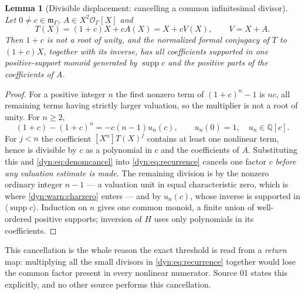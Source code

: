 \documentclass[11pt,letterpaper]{article}
\newtheorem{lemma}[lemma]{Lemma}
\theoremstyle{definition}
\theoremstyle{remark}
\newcommand{\Q}{\mathbb Q}
\newcommand{\OO}{\mathcal O}
\newcommand{\m}{\mathfrak m}
\newcommand{\supp}{\operatorname{supp}}
\numberwithin{equation}{section}
\begin{document}
\begin{lemma}[Divisible displacement: cancelling a common infinitesimal
divisor]\label{dyn:lem:displacement}
Let $0\ne c\in\m_\Gamma$, $A\in X^{2}\OO_\Gamma[X]$ and
\begin{equation}\label{dyn:eq:T-displacement}
 T(X)=(1+c)X+cA(X)=X+cV(X),\qquad V=X+A .
\end{equation}
Then $1+c$ is not a root of unity, and the normalized formal conjugacy of
$T$ to $(1+c)X$, together with its inverse, has all coefficients supported
in one positive-support monoid generated by $\supp c$ and the positive
parts of the coefficients of $A$.
\end{lemma}
\begin{proof}
For a positive integer $n$ the first nonzero term of $(1+c)^{n}-1$ is
$nc$, all remaining terms having strictly larger valuation, so the
multiplier is not a root of unity. For $n\ge2$,
\begin{equation}\label{dyn:eq:denomcancel}
 (1+c)-(1+c)^{n}=-c(n-1)u_n(c),\qquad u_n(0)=1,\quad u_n\in\Q[c].
\end{equation}
For $j<n$ the coefficient $[X^{n}]T(X)^{j}$ contains at least one nonlinear
term, hence is divisible by $c$ as a polynomial in $c$ and the coefficients
of $A$. Substituting this and \eqref{dyn:eq:denomcancel} into
\eqref{dyn:eq:recurrence} cancels one factor $c$ \emph{before any
valuation estimate is made}. The remaining division is by the nonzero
ordinary integer $n-1$ --- a valuation unit in equal characteristic zero,
which is where \cref{dyn:warn:charzero} enters --- and by $u_n(c)$, whose
inverse is supported in $\langle\supp c\rangle$. Induction on $n$ gives one
common monoid, a finite union of well-ordered positive supports; inversion
of $H$ uses only polynomials in its coefficients.
\end{proof}

This cancellation is the whole reason the exact threshold is read from a
\emph{return} map: multiplying all the small divisors in
\eqref{dyn:eq:recurrence} together would lose the common factor present in
every nonlinear numerator. Source 01 states this explicitly, and no other
source performs this cancellation.
\end{document}
